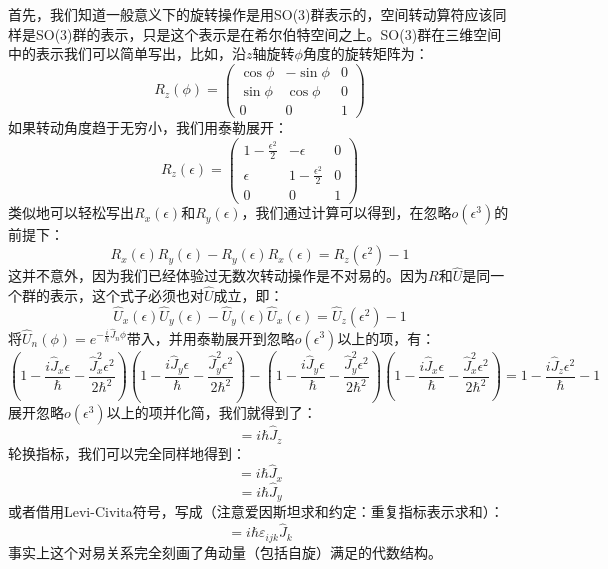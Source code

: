 \documentclass{ctexart}
\begin{document}
首先，我们知道一般意义下的旋转操作是用SO(3)群表示的，空间转动算符应该同样是SO(3)群的表示，只是这个表示是在希尔伯特空间之上。SO(3)群在三维空间中的表示我们可以简单写出，比如，沿$z$轴旋转$\phi$角度的旋转矩阵为：
\begin{equation}
R_z(\phi)=\begin{pmatrix}
\cos\phi &-\sin\phi & 0 \\
\sin\phi &\cos\phi & 0 \\
0 & 0 & 1
\end{pmatrix}
\end{equation}
如果转动角度趋于无穷小，我们用泰勒展开：
\begin{equation}
R_z(\epsilon)=\begin{pmatrix}
1-\frac{\epsilon^2}{2} &-\epsilon & 0 \\
\epsilon &1-\frac{\epsilon^2}{2} & 0 \\
0 & 0 & 1
\end{pmatrix}
\end{equation}
类似地可以轻松写出$R_x(\epsilon)$和$R_y(\epsilon)$，我们通过计算可以得到，在忽略$o(\epsilon^3)$的前提下：
\begin{equation}
R_x(\epsilon)R_y(\epsilon)-R_y(\epsilon)R_x(\epsilon)=R_z(\epsilon^2)-1
\end{equation}
这并不意外，因为我们已经体验过无数次转动操作是不对易的。因为$R$和$\hat{U}$是同一个群的表示，这个式子必须也对$\hat{U}$成立，即：
\begin{equation}
\hat{U}_x(\epsilon)\hat{U}_y(\epsilon)-\hat{U}_y(\epsilon)\hat{U}_x(\epsilon)=\hat{U}_z(\epsilon^2)-1
\end{equation}
将$\hat{U}_n(\phi)=e^{-\frac{i}{\hbar}\hat{J}_n\phi}$带入，并用泰勒展开到忽略$o(\epsilon^3)$以上的项，有：
\begin{equation}
\left(1-\frac{i\hat{J}_x\epsilon}{\hbar}-\frac{\hat{J}^2_x\epsilon^2}{2\hbar^2}\right)\left(1-\frac{i\hat{J}_y\epsilon}{\hbar}-\frac{\hat{J}^2_y\epsilon^2}{2\hbar^2}\right)-\left(1-\frac{i\hat{J}_y\epsilon}{\hbar}-\frac{\hat{J}^2_y\epsilon^2}{2\hbar^2}\right)\left(1-\frac{i\hat{J}_x\epsilon}{\hbar}-\frac{\hat{J}^2_x\epsilon^2}{2\hbar^2}\right)=1-\frac{i\hat{J}_z\epsilon^2}{\hbar}-1
\end{equation}
展开忽略$o(\epsilon^3)$以上的项并化简，我们就得到了：
\begin{equation}
[\hat{J}_x,\hat{J}_y]=i\hbar\hat{J}_z
\end{equation}
轮换指标，我们可以完全同样地得到：
\begin{equation}
[\hat{J}_y,\hat{J}_z]=i\hbar\hat{J}_x
\end{equation}
\begin{equation}
[\hat{J}_z,\hat{J}_x]=i\hbar\hat{J}_y
\end{equation}
或者借用Levi-Civita符号，写成（注意爱因斯坦求和约定：重复指标表示求和）：
\begin{equation}
[\hat{J}_i,\hat{J}_j]=i\hbar\varepsilon_{ijk}\hat{J}_k
\end{equation}
事实上这个对易关系完全刻画了角动量（包括自旋）满足的代数结构。
\end{document}

